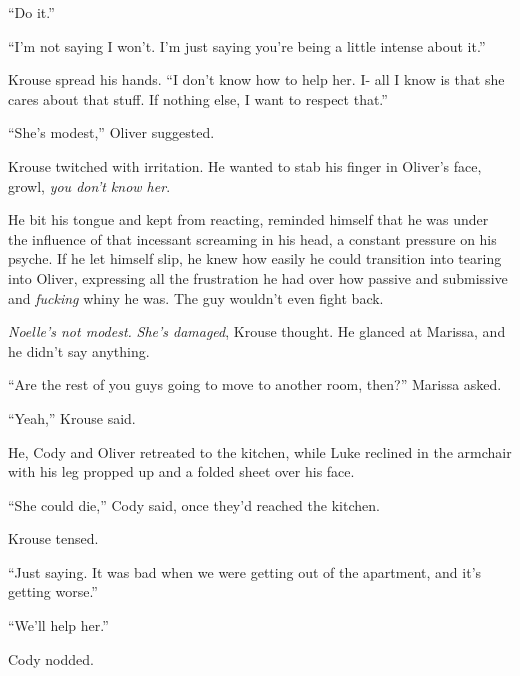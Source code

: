 ``Do it.''



``I'm not saying I won't.  I'm just saying you're being a little intense about it.''



Krouse spread his hands.  ``I don't know how to help her.  I-  all I know is that she cares about that stuff.  If nothing else, I want to respect that.''



``She's modest,'' Oliver suggested.



Krouse twitched with irritation.  He wanted to stab his finger in Oliver's face, growl, \emph{you don't know her}.



He bit his tongue and kept from reacting, reminded himself that he was under the influence of that incessant screaming in his head, a constant pressure on his psyche.  If he let himself slip, he knew how easily he could transition into tearing into Oliver, expressing all the frustration he had over how passive and submissive and \emph{fucking} whiny he was.  The guy wouldn't even fight back.



\emph{Noelle's not modest.  }\emph{She's damaged}, Krouse thought.  He glanced at Marissa, and he didn't say anything.



``Are the rest of you guys going to move to another room, then?'' Marissa asked.



``Yeah,'' Krouse said.



He, Cody and Oliver retreated to the kitchen, while Luke reclined in the armchair with his leg propped up and a folded sheet over his face.



``She could die,'' Cody said, once they'd reached the kitchen.



Krouse tensed.



``Just saying.  It was bad when we were getting out of the apartment, and it's getting worse.''



``We'll help her.''



Cody nodded.



